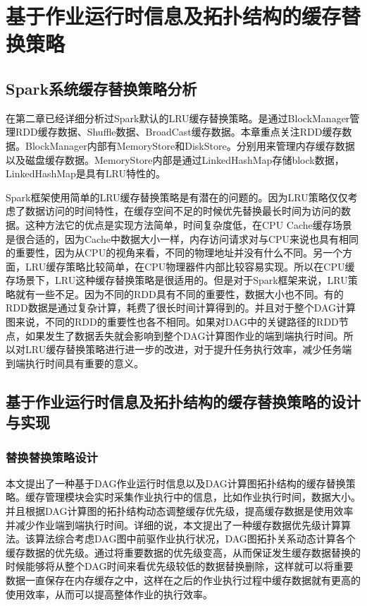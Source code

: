 \chapter{基于作业运行时信息及拓扑结构的缓存替换策略}\label{chap:guide}
\section{Spark系统缓存替换策略分析}

在第二章已经详细分析过Spark默认的LRU缓存替换策略。是通过BlockManager管理RDD缓存数据、Shuffle数据、BroadCast缓存数据。本章重点关注RDD缓存数据。BlockManager内部有MemoryStore和DiskStore。分别用来管理内存缓存数据以及磁盘缓存数据。MemoryStore内部是通过LinkedHashMap存储block数据，LinkedHashMap是具有LRU特性的。

Spark框架使用简单的LRU缓存替换策略是有潜在的问题的。因为LRU策略仅仅考虑了数据访问的时间特性，在缓存空间不足的时候优先替换最长时间为访问的数据。这种方法它的优点是实现方法简单，时间复杂度低，在CPU Cache缓存场景是很合适的，因为Cache中数据大小一样，内存访问请求对与CPU来说也具有相同的重要性，因为从CPU的视角来看，不同的物理地址并没有什么不同。另一个方面，LRU缓存策略比较简单，在CPU物理器件内部比较容易实现。所以在CPU缓存场景下，LRU这种缓存替换策略是很适用的。但是对于Spark框架来说，LRU策略就有一些不足。因为不同的RDD具有不同的重要性，数据大小也不同。有的RDD数据是通过复杂计算，耗费了很长时间计算得到的。并且对于整个DAG计算图来说，不同的RDD的重要性也各不相同。如果对DAG中的关键路径的RDD节点，如果发生了数据丢失就会影响到整个DAG计算图作业的端到端执行时间。所以对LRU缓存替换策略进行进一步的改进，对于提升任务执行效率，减少任务端到端执行时间具有重要的意义。

\section{基于作业运行时信息及拓扑结构的缓存替换策略的设计与实现}

\subsection{替换替换策略设计}

本文提出了一种基于DAG作业运行时信息以及DAG计算图拓扑结构的缓存替换策略。缓存管理模块会实时采集作业执行中的信息，比如作业执行时间，数据大小。并且根据DAG计算图的拓扑结构动态调整缓存优先级，提高缓存数据是使用效率并减少作业端到端执行时间。详细的说，本文提出了一种缓存数据优先级计算算法。该算法综合考虑DAG图中前驱作业执行状况，DAG图拓扑关系动态计算各个缓存数据的优先级。通过将重要数据的优先级变高，从而保证发生缓存数据替换的时候能够将从整个DAG时间来看优先级较低的数据替换删除，这样就可以将重要数据一直保存在内存缓存之中，这样在之后的作业执行过程中缓存数据就有更高的使用效率，从而可以提高整体作业的执行效率。

